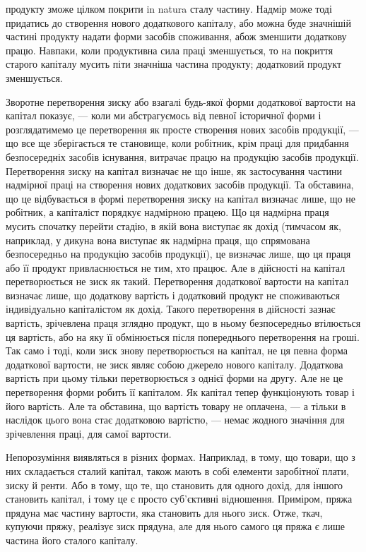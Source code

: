 \parcont{}  %
продукту зможе цілком покрити in natura сталу частину. Надмір може тоді
придатись до створення нового додаткового капіталу, або можна буде значнішій
частині продукту надати форми засобів споживання, абож зменшити додаткову
працю. Навпаки, коли продуктивна сила праці зменшується, то на покриття старого
капіталу мусить піти значніша частина продукту; додатковий продукт зменшується.

Зворотне перетворення зиску або взагалі будь-якої форми додаткової вартости
на капітал показує, — коли ми абстрагуємось від певної історичної форми
і розглядатимемо це перетворення як просте створення нових засобів продукції, —
що все ще зберігається те становище, коли робітник, крім праці для придбання
безпосередніх засобів існування, витрачає працю на продукцію засобів продукції.
Перетворення зиску на капітал визначає не що інше, як застосування
частини надмірної праці на створення нових додаткових засобів продукції. Та
обставина, що це відбувається в формі перетворення зиску на капітал визначає лише,
що не робітник, а капіталіст порядкує надмірною працею. Що ця надмірна праця
мусить спочатку перейти стадію, в якій вона виступає як дохід (тимчасом як,
наприклад, у дикуна вона виступає як надмірна праця, що спрямована безпосередньо
на продукцію засобів продукції), це визначає лише, що ця праця або
її продукт привласнюється не тим, хто працює. Але в дійсності на капітал
перетворюється не зиск як такий. Перетворення додаткової вартости на капітал
визначає лише, що додаткову вартість і додатковий продукт не споживаються
індивідуально капіталістом як дохід. Такого перетворення в дійсності
зазнає вартість, зрічевлена праця зглядно продукт, що в ньому безпосередньо втілюється ця вартість,
або на яку її обмінюється після попереднього перетворення
на гроші. Так само і тоді, коли зиск знову перетворюється на капітал, не ця
певна форма додаткової вартости, не зиск являє собою джерело нового капіталу.
Додаткова вартість при цьому тільки перетворюється з однієї форми на другу.
Але не це перетворення форми робить її капіталом. Як капітал тепер функціонують
товар і його вартість. Але та обставина, що вартість товару не оплачена, —
а тільки в наслідок цього вона стає додатковою вартістю, — немає жодного значіння
для зрічевлення праці, для самої вартости.

Непорозуміння виявляться в різних формах. Наприклад, в тому, що товари,
що з них складається сталий капітал, також мають в собі елементи заробітної
плати, зиску й ренти. Або в тому, що те, що становить для одного дохід, для
іншого становить капітал, і тому це є просто суб’єктивні відношення. Приміром,
пряжа прядуна має частину вартости, яка становить для нього зиск. Отже, ткач,
купуючи пряжу, реалізує зиск прядуна, але для нього самого ця пряжа є лише
частина його сталого капіталу.

